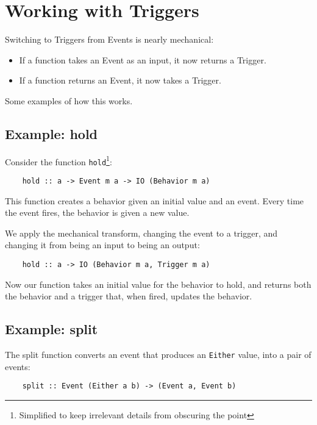 \documentclass{article}
\begin{document}
\section{Working with Triggers}

Switching to Triggers from Events is nearly mechanical:

\begin{itemize}
\item If a function takes an Event as an input, it now returns a
Trigger.
\item If a function returns an Event, it now takes a Trigger.
\end{itemize}

Some examples of how this works.

\subsection{Example: hold}

Consider the function \verb|hold|\footnote{Simplified to keep irrelevant
details from obscuring the point}:

\begin{verbatim}
    hold :: a -> Event m a -> IO (Behavior m a)
\end{verbatim}

This function creates a behavior given an initial value and an event.
Every time the event fires, the behavior is given a new value. 

We apply the mechanical transform, changing the event to a trigger, and
changing it from being an input to being an output:

\begin{verbatim}
    hold :: a -> IO (Behavior m a, Trigger m a)
\end{verbatim}

Now our function takes an initial value for the behavior to hold, and
returns both the behavior and a trigger that, when fired, updates the
behavior.

\subsection{Example: split}

The split function converts an event that produces an \verb|Either|
value, into a pair of events:

\begin{verbatim}
    split :: Event (Either a b) -> (Event a, Event b)
\end{verbatim}
\end{document}
